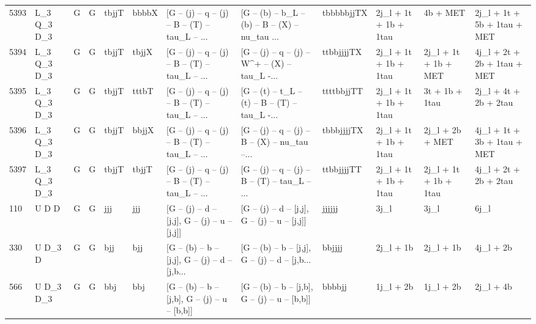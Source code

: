 \begin{tabular}{llllllllllll}
5393 &  L\_3 Q\_3 D\_3 &     G &     G &       tbjjT &       bbbbX &  [G -- (j) -- q -- (j) -- B -- (T) -- tau\_L -- ... &  [G -- (b) -- b\_L -- (b) -- B -- (X) -- nu\_tau ... &  tbbbbbjjTX &    2j\_l + 1t + 1b + 1tau &                 4b + MET &        2j\_l + 1t + 5b + 1tau + MET \\
5394 &  L\_3 Q\_3 D\_3 &     G &     G &       tbjjT &       tbjjX &  [G -- (j) -- q -- (j) -- B -- (T) -- tau\_L -- ... &  [G -- (j) -- q -- (j) -- W\textasciicircum + -- (X) -- tau\_L -... &  ttbbjjjjTX &    2j\_l + 1t + 1b + 1tau &     2j\_l + 1t + 1b + MET &        4j\_l + 2t + 2b + 1tau + MET \\
5395 &  L\_3 Q\_3 D\_3 &     G &     G &       tbjjT &       tttbT &  [G -- (j) -- q -- (j) -- B -- (T) -- tau\_L -- ... &  [G -- (t) -- t\_L -- (t) -- B -- (T) -- tau\_L -... &  ttttbbjjTT &    2j\_l + 1t + 1b + 1tau &           3t + 1b + 1tau &              2j\_l + 4t + 2b + 2tau \\
5396 &  L\_3 Q\_3 D\_3 &     G &     G &       tbjjT &       bbjjX &  [G -- (j) -- q -- (j) -- B -- (T) -- tau\_L -- ... &  [G -- (j) -- q -- (j) -- B -- (X) -- nu\_tau --... &  tbbbjjjjTX &    2j\_l + 1t + 1b + 1tau &          2j\_l + 2b + MET &        4j\_l + 1t + 3b + 1tau + MET \\
5397 &  L\_3 Q\_3 D\_3 &     G &     G &       tbjjT &       tbjjT &  [G -- (j) -- q -- (j) -- B -- (T) -- tau\_L -- ... &  [G -- (j) -- q -- (j) -- B -- (T) -- tau\_L -- ... &  ttbbjjjjTT &    2j\_l + 1t + 1b + 1tau &    2j\_l + 1t + 1b + 1tau &              4j\_l + 2t + 2b + 2tau \\
110  &        U D D &     G &     G &         jjj &         jjj &   [G -- (j) -- d -- [j,j], G -- (j) -- u -- [j,j]] &   [G -- (j) -- d -- [j,j], G -- (j) -- u -- [j,j]] &      jjjjjj &                     3j\_l &                     3j\_l &                               6j\_l \\
330  &      U D\_3 D &     G &     G &         bjj &         bjj &  [G -- (b) -- b -- [j,j], G -- (j) -- d -- [j,b... &  [G -- (b) -- b -- [j,j], G -- (j) -- d -- [j,b... &      bbjjjj &                2j\_l + 1b &                2j\_l + 1b &                          4j\_l + 2b \\
566  &    U D\_3 D\_3 &     G &     G &         bbj &         bbj &   [G -- (b) -- b -- [j,b], G -- (j) -- u -- [b,b]] &   [G -- (b) -- b -- [j,b], G -- (j) -- u -- [b,b]] &      bbbbjj &                1j\_l + 2b &                1j\_l + 2b &                          2j\_l + 4b \\

\end{tabular}
